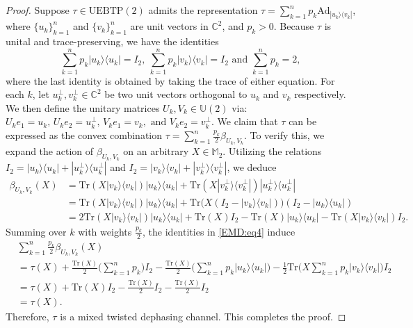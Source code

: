 \documentclass[11pt,reqno]{amsart}
\theoremstyle{definition}
\theoremstyle{plain}
\theoremstyle{remark}
\newcommand{\la}{\langle}
\newcommand{\ra}{\rangle}
\numberwithin{equation}{section}%
\begin{document}
 
 \begin{proof}
 	Suppose $\tau \in \mathrm{UEBTP}(2)$ admits the representation $\tau = \sum_{k=1}^n p_k \text{Ad}_{|u_k\ra\la v_k|}$, where $\{u_k\}_{k=1}^n$ and $\{v_k\}_{k=1}^n$ are unit vectors in $\mathbb{C}^2$, and $p_k > 0$. Because $\tau$ is unital and trace-preserving, we have the identities
 	\begin{equation}\label{EMD:eq4}
 		\sum_{k=1}^n p_k |u_k\ra\la u_k| = I_2,\ \sum_{k=1}^n p_k |v_k\ra\la v_k| = I_2 \text{ and } \sum_{k=1}^np_k=2,
 	\end{equation}
 	where the last identity is obtained by taking the trace of either equation. For each $k$, let $u_k^\perp, v_k^\perp \in \mathbb{C}^2$ be two unit vectors orthogonal to $u_k$ and $v_k$ respectively. We then define the unitary matrices $U_k, V_k \in \mathbb{U}(2)$ via: $
 	U_k e_1 = u_k,\, U_k e_2 = u_k^\perp,\, V_k e_1 = v_k, \text{ and } V_k e_2 = v_k^\perp.$
 	We claim that $\tau$ can be expressed as the convex combination $\tau = \sum_{k=1}^n \frac{p_k}{2} \beta_{U_k, V_k}$. To verify this, we expand the action of $\beta_{U_k, V_k}$ on an arbitrary $X \in \mathbb{M}_2$. Utilizing the relations $I_2 = |u_k\ra\la u_k| + |u_k^\perp\ra\la u_k^\perp|$ and $I_2 = |v_k\ra\la v_k| + |v_k^\perp\ra\la v_k^\perp|$, we deduce
 	\begin{align*}
 		\beta_{U_k, V_k}(X)
 		&= \text{Tr}(X|v_k\ra\la v_k|)|u_k\ra\la u_k| + \text{Tr}(X|v_k^\perp\ra\la v_k^\perp|)|u_k^\perp\ra\la u_k^\perp| \\
 		&= \text{Tr}(X|v_k\ra\la v_k|)|u_k\ra\la u_k| + \text{Tr}\big(X(I_2 - |v_k\ra\la v_k|)\big)(I_2 - |u_k\ra\la u_k|) \\
 		&= 2\text{Tr}(X|v_k\ra\la v_k|)|u_k\ra\la u_k| + \text{Tr}(X)I_2 - \text{Tr}(X)|u_k\ra\la u_k| - \text{Tr}(X|v_k\ra\la v_k|)I_2.
 	\end{align*}
 	Summing over $k$ with weights $\frac{p_k}{2}$, the identities in \eqref{EMD:eq4} induce
 	\begin{align*}
 		&\sum_{k=1}^n \frac{p_k}{2} \beta_{U_k, V_k}(X)\\
 		&= \tau(X) + \frac{\text{Tr}(X)}{2} \bigg(\sum_{k=1}^n p_k\bigg)I_2 - \frac{\text{Tr}(X)}{2} \bigg(\sum_{k=1}^n p_k|u_k\ra\la u_k|\bigg) - \frac{1}{2} \text{Tr}\bigg(X\sum_{k=1}^n p_k|v_k\ra\la v_k|\bigg)I_2 \\
 		&= \tau(X) + \text{Tr}(X)I_2 - \frac{\text{Tr}(X)}{2}I_2 - \frac{\text{Tr}(X)}{2}I_2 \\
 		&= \tau(X).
 	\end{align*}
 	Therefore, $\tau$ is a mixed twisted dephasing channel. This completes the proof.
 \end{proof}
 
\end{document}
